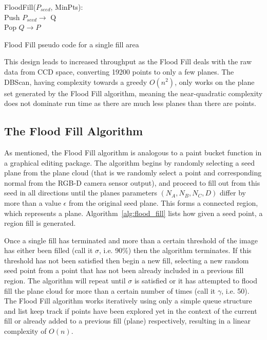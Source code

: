 \documentclass[]{article}
\begin{document}
{\begin{algorithm}[tbp]
	\SetAlgoLined
	\bigskip
	FloodFill($P_{seed}$, MinPts): \\
	Push $P_{seed} \rightarrow$ Q \\
	{
	 	Pop $Q \rightarrow P$ \\
	}
	\bigskip
	\caption{Flood Fill pseudo code for a single fill area}
	\label{alg:flood_fill}
\end{algorithm}

This design leads to increased throughput as the Flood Fill deals with the raw data from CCD space, converting 19200 points to only a few planes. The DBScan, having complexity towards a greedy $O(n^{2})$, only works on the plane set generated by the Flood Fill algorithm, meaning the near-quadratic complexity does not dominate run time as there are much less planes than there are points.

\subsection{The Flood Fill Algorithm}
\label{sub:flood_fill_algo}
As mentioned, the Flood Fill algorithm is analogous to a paint bucket function in a graphical editing package. The algorithm begins by randomly selecting a seed plane from the plane cloud (that is we randomly select a point and corresponding normal from the RGB-D camera sensor output), and proceed to fill out from this seed in all directions until the planes parameters $(N_A, N_B, N_C, D)$ differ by more than a value $\epsilon$ from the original seed plane. This forms a connected region, which represents a plane. Algorithm~\ref{alg:flood_fill} lists how given a seed point, a region fill is generated.

Once a single fill has terminated and more than a certain threshold of the image has either been filled (call it $\sigma$, i.e. 90\%) then the algorithm terminates. If this threshold has not been satisfied then begin a new fill, selecting a new random seed point from a point that has not been already included in a previous fill region. The algorithm will repeat until $\sigma$ is satisfied or it has attempted to flood fill the plane cloud for more than a certain number of times (call it $\gamma$, i.e. 50). The Flood Fill algorithm works iteratively using only a simple queue structure and list keep track if points have been explored yet in the context of the current fill or already added to a previous fill (plane) respectively, resulting in a linear complexity of $O(n)$. 


}
\end{document}

